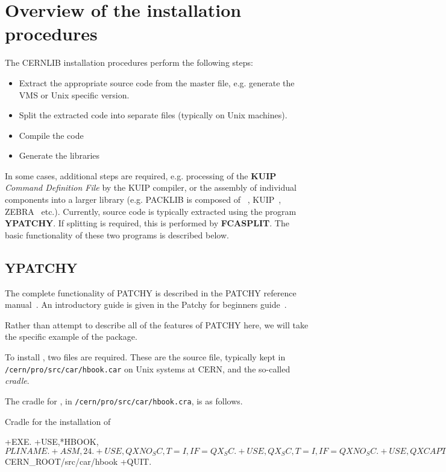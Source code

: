 \chapter{Overview of the installation procedures}
The CERNLIB installation procedures perform the following steps:
\begin{itemize}
\item
Extract the appropriate source code from the master file,
e.g. generate the VMS or Unix specific version.
\item
Split the extracted code into separate files (typically on Unix machines).
\item
Compile the code
\item
Generate the libraries
\end{itemize}

In some cases, additional steps are required, e.g. processing
of the {\bf KUIP} {\it Command Definition File} by the KUIP
compiler, or the assembly of individual components into a 
larger library (e.g. PACKLIB is composed of 
\HBOOK{}~\cite{bib-HBOOK}, KUIP~\cite{bib-KUIP}, ZEBRA~\cite{bib-ZEBRA} etc.).
Currently, source code is typically extracted using the program
{\bf YPATCHY}. If splitting is required, this is performed by
{\bf FCASPLIT}. The basic functionality of these two programs
is described below.
\section{YPATCHY}
The complete functionality of PATCHY is described in the
PATCHY reference manual~\cite{bib-PATCHY}. An introductory
guide is given in the Patchy for beginners guide~\cite{bib-SIMPATCH}.

Rather than attempt to describe all of the features of 
PATCHY here, we will take the
specific example of the \HBOOK{} package.

To install \HBOOK{}, two files are required. These are the \HBOOK{}
source file, typically kept in {\tt /cern/pro/src/car/hbook.car}
on Unix systems at CERN, and the so-called {\it cradle}.

The cradle for \HBOOK{}, in {\tt /cern/pro/src/car/hbook.cra},
is as follows.

\begin{XMPt}{Cradle for the installation of \HBOOK{}}

+EXE.
+USE,*HBOOK,$PLINAME.
+ASM,24.
+USE,QXNO_SC ,T=I,IF=QX_SC.
+USE,QX_SC   ,T=I,IF=QXNO_SC.
+USE,QXCAPT  ,T=I,IF=QXNO_SC,QX_SC.
+PAM,11,T=C,A.$CERN_ROOT/src/car/hbook
+QUIT.

\end{XMPt}

